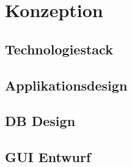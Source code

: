\chapter{Konzeption}
\section{Technologiestack}
\section{Applikationsdesign}
\section{DB Design}
\section{GUI Entwurf}